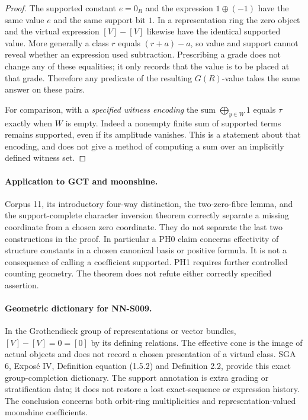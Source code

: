 \begin{proof}
The supported constant $e=0_R$ and the expression
$1\mathbin\oplus(-1)$ have the same value $e$ and the same
support bit $1$. In a representation ring the zero object and
the virtual expression $[V]-[V]$ likewise have the identical
supported value. More generally a class $r$ equals
$(r+a)-a$, so value and support cannot reveal whether an
expression used subtraction. Prescribing a grade does not change
any of these equalities; it only records that the value is to be
placed at that grade. Therefore any predicate of the resulting
$G(R)$-value takes the same answer on these pairs.

For comparison, with a \emph{specified witness encoding} the sum
$\bigoplus_{y\in W}1$ equals $\tau$ exactly when $W$ is empty.
Indeed a nonempty finite sum of supported terms remains supported,
even if its amplitude vanishes. This is a statement about that
encoding, and does not give a method of computing a sum over an
implicitly defined witness set.
\end{proof}

\paragraph{Application to GCT and moonshine.}
Corpus 11, its introductory four-way distinction, the two-zero-fibre
lemma, and the support-complete character inversion theorem correctly
separate a missing coordinate from a chosen zero coordinate.
They do not separate the last two constructions in the proof.
In particular a PH0 claim concerns effectivity of structure
constants in a chosen canonical basis or positive formula.
It is not a consequence of calling a coefficient supported.
PH1 requires further controlled counting geometry. The theorem
does not refute either correctly specified assertion.

\paragraph{Geometric dictionary for NN-S009.}
In the Grothendieck group of representations or vector bundles,
$[V]-[V]=0=[0]$ by its defining relations. The effective cone is
the image of actual objects and does not record a chosen
presentation of a virtual class. SGA 6, Expos\'e IV, Definition
equation (1.5.2) and Definition 2.2, provide this exact group-completion
dictionary. The support annotation is extra grading or
stratification data; it does not restore a lost exact-sequence
or expression history. The conclusion concerns both orbit-ring
multiplicities and representation-valued moonshine coefficients.



